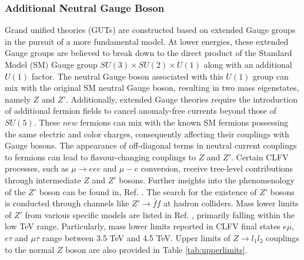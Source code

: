 \subsubsection{Additional Neutral Gauge Boson}
Grand unified theories (GUTs) are constructed based on extended Gauge groups in the pursuit of a more fundamental model. At lower energies, these extended Gauge groups are believed to break down to the direct product of the Standard Model (SM) Gauge group $SU(3) \times SU(2) \times U(1)$ along with an additional $U(1)$ factor. The neutral Gauge boson associated with this $U(1)$ group can mix with the original SM neutral Gauge boson, resulting in two mass eigenstates, namely $Z$ and $Z'$. Additionally, extended Gauge theories require the introduction of additional fermion fields to cancel anomaly-free currents beyond those of $SU(5)$. These $new$ fermions can mix with the known SM fermions possessing the same electric and color charges, consequently affecting their couplings with Gauge bosons. The appearance of off-diagonal terms in neutral current couplings to fermions can lead to flavour-changing couplings to $Z$ and $Z'$. Certain CLFV processes, such as $\mu \rightarrow eee$ and $\mu-e$ conversion, receive tree-level contributions through intermediate $Z$ and $Z'$ bosons. Further insights into the phenomenology of the $Z'$ boson can be found in, Ref. \cite{Leike_1999}. The search for the existence of $Z'$ bosons is conducted through channels like $Z' \rightarrow \bar{f}f$ at hadron colliders. Mass lower limits of $Z'$ from various specific models are listed in Ref. \cite{zyla}, primarily falling within the low TeV range. Particularly, mass lower limits reported in CLFV final states $e\mu$, $e\tau$ and $\mu\tau$ range between 3.5 TeV and 4.5 TeV. Upper limits of $Z \rightarrow l_1 l_2$ couplings to the normal $Z$ boson are also provided in Table \ref{tab:upperlimits}.

% 
